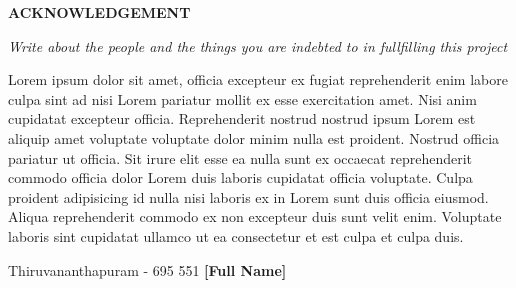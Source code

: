 \begin{center}
  {\Large{\bf{ACKNOWLEDGEMENT}}}
\end{center}

\vspace{2em}

\textit{Write about the people and the things you are indebted to in fullfilling this project}

Lorem ipsum dolor sit amet, officia excepteur ex fugiat reprehenderit enim labore culpa sint ad nisi Lorem pariatur mollit ex esse exercitation amet. Nisi anim cupidatat excepteur officia. Reprehenderit nostrud nostrud ipsum Lorem est aliquip amet voluptate voluptate dolor minim nulla est proident. Nostrud officia pariatur ut officia. Sit irure elit esse ea nulla sunt ex occaecat reprehenderit commodo officia dolor Lorem duis laboris cupidatat officia voluptate. Culpa proident adipisicing id nulla nisi laboris ex in Lorem sunt duis officia eiusmod. Aliqua reprehenderit commodo ex non excepteur duis sunt velit enim. Voluptate laboris sint cupidatat ullamco ut ea consectetur et est culpa et culpa duis.

\vspace{3em}

\noindent Thiruvananthapuram - 695 551 \hfill \textbf{[Full Name]}
